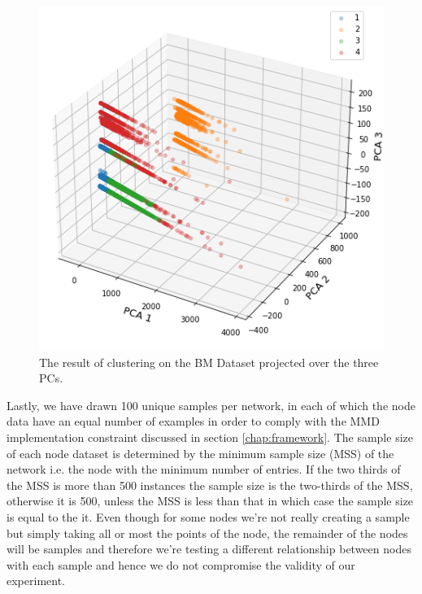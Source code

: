 \documentclass{mpaper}
\begin{document}
\begin{figure}
\centering
\begin{center}
\includegraphics[scale=0.45]{bm_clustering.png}
\end{center}
\caption{\label{fig-BMcl} The result of clustering on the BM Dataset projected over the three PCs.}
\end{figure}

Lastly, we have drawn 100 unique samples per network, in each of which the node data have an equal number of examples in order to comply with the MMD implementation constraint discussed in section \ref{chap:framework}. The sample size of each node dataset is determined by the minimum sample size (MSS) of the network i.e. the node with the minimum number of entries. If the two thirds of the MSS is more than 500 instances the sample size is the two-thirds of the MSS, otherwise it is 500, unless the MSS is less than that in which case the sample size is equal to the it. Even though for some nodes we're not really creating a sample but simply taking all or most the points of the node, the remainder of the nodes will be samples and therefore we're testing a different relationship between nodes with each sample and hence we do not compromise the validity of our experiment.
\end{document}
